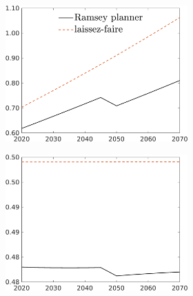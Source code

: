 \begin{figure}[h!!]
	\centering
	\caption{Allocations in levels; no knowledge spillovers }\label{fig:LF_noKN}	
	\begin{subfigure}{1\textwidth}		
		\caption{Laissez-faire and optimal allocation}
		\begin{subfigure}[]{0.32\textwidth}
			\includegraphics[width=1\textwidth]{../../codding_model/own_basedOnFried/optimalPol_010922_revision/figures/all_13Sept22_Tplus30/C_LFCompOPT_T_NoTaus_regime4_spillover0_noskill0_sep0_xgrowth0_PV1_etaa0.79_lgd1.png}
		\end{subfigure}	
		\begin{subfigure}[]{0.32\textwidth}
			\includegraphics[width=1\textwidth]{../../codding_model/own_basedOnFried/optimalPol_010922_revision/figures/all_13Sept22_Tplus30/hh_LFCompOPT_T_NoTaus_regime4_spillover0_noskill0_sep0_xgrowth0_PV1_etaa0.79_lgd0.png}

\end{subfigure}
\end{subfigure}
\end{figure}
